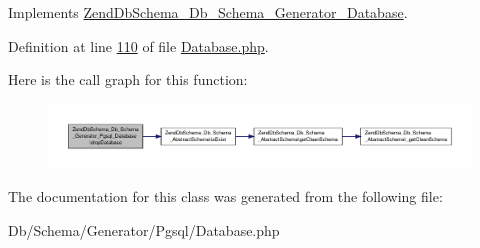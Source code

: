 Implements \hyperlink{interfaceZendDbSchema__Db__Schema__Generator__Database_acd0cfc49f30c3bbbae29f0f748c1c428}{Zend\-Db\-Schema\-\_\-\-Db\-\_\-\-Schema\-\_\-\-Generator\-\_\-\-Database}.



Definition at line \hyperlink{Generator_2Pgsql_2Database_8php_source_l00110}{110} of file \hyperlink{Generator_2Pgsql_2Database_8php_source}{Database.\-php}.



Here is the call graph for this function\-:\nopagebreak
\begin{figure}[H]
\begin{center}
\leavevmode
\includegraphics[width=350pt]{classZendDbSchema__Db__Schema__Generator__Pgsql__Database_ad5abe9239fea98c39605aeb77f6ca268_cgraph}
\end{center}
\end{figure}




The documentation for this class was generated from the following file\-:\begin{DoxyCompactItemize}
\item 
Db/\-Schema/\-Generator/\-Pgsql/Database.\-php\end{DoxyCompactItemize}
